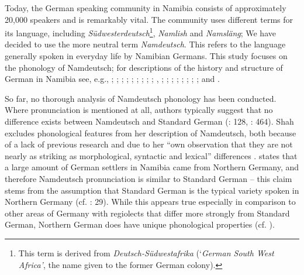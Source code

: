 \documentclass[output=paper]{langsci/langscibook}
\begin{document}
Today, the German speaking community in Namibia consists of approximately 20,000 speakers and is remarkably vital. The community uses different terms for its language, including \textit{Südwesterdeutsch}\footnote{This term is derived from \textit{Deutsch-Südwestafrika} (‘\textit{German South West Africa’}, the name given to the former German colony).}, \textit{Namlish} and \textit{Namsläng}; We have decided to use the more neutral term \textit{Namdeutsch}. This refers to the language generally spoken in everyday life by Namibian Germans. This study focuses on the phonology of Namdeutsch; for descriptions of the history and structure of German in Namibia see, e.g., \citet{nockler_sprachmischung_1963};  \citet{putz_sudwesterdeutsch_1991, putz_official_1995}; \citet{gretschel_status_1995}; \citet{schmidt-lauber_verkehrte_1998}; \citet{bohm_deutsch_2003}; \citet{shah_german_2007}; \citet{deumert_namibian_2009, deumert_settler_2018}; \citet{ammon_stellung_2014}; \citet{riehl_sprachkontaktforschung_2004}; \citet{kellermeier-rehbein_namslang_2015}, \citet{wiese_german_2017}; \citet{duck_namibia_2018}; \citet{kroll-tjingaete_strukturelle_2018};  \citet{shah_german_2018}; \citet{stolz_weg_2018}; \citet{zappen-thomson_stutzung_2019}; \citet{zimmer_deutsch_2019, zimmer_kasus_2020, zimmer_siedlungsgeschichte_nodate, zimmer_wie_nodate, zimmer_sprachliche_nodate}; \citet{wiese_registerdifferenzierung_2021};  and .%

So far, no thorough analysis of Namdeutsch phonology has been conducted. Where pronunciation is mentioned at all, authors typically suggest that no difference exists between Namdeutsch and Standard German (\citealt{nockler_sprachmischung_1963}: 128, \citealt{putz_sudwesterdeutsch_1991}: 464). Shah excludes phonological features from her description of Namdeutsch, both because of a lack of previous research and due to her “own observation that they are not nearly as striking as morphological, syntactic and lexical” differences \citep[23]{shah_german_2007}. \citet[564]{bohm_deutsch_2003} states that a large amount of German settlers in Namibia came from Northern Germany, and therefore Namdeutsch pronunciation is similar to Standard German – this claim stems from the assumption that Standard German is the typical variety spoken in Northern Germany (cf. \citealt{clyne_german_1995}: 29). While this appears true especially in comparison to other areas of Germany with regiolects that differ more strongly from Standard German, Northern German does have unique phonological properties (cf. \citealt{elmentaler_norddeutscher_2015}). 
\end{document}
